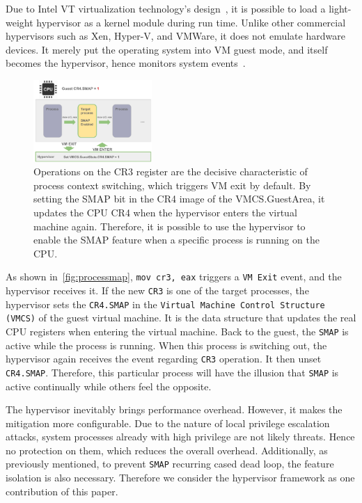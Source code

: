 Due to Intel VT virtualization technology's design~\cite{neiger2006intel}, it is possible to load a light-weight hypervisor as a kernel module during run time. Unlike other commercial hypervisors such as Xen, Hyper-V, and VMWare, it does not emulate hardware devices. It merely put the operating system into VM guest mode, and itself becomes the hypervisor, hence monitors system events~\cite{howtohide}.


\begin{figure}[th]
  \includegraphics[width=0.40\textwidth]{figures/processmap3}
  \centering
  \caption{Operations on the CR3 register are the decisive characteristic of process context switching, which triggers VM exit by default. By setting the SMAP bit in the CR4 image of the VMCS.GuestArea, it updates the CPU CR4 when the hypervisor enters the virtual machine again. Therefore, it is possible to use the hypervisor to enable the SMAP feature when a specific process is running on the CPU.}
  \label{fig:processmap}
\end{figure}


As shown in~\autoref{fig:processmap}, \texttt{mov cr3, eax} triggers a \texttt{VM Exit} event, and the hypervisor receives it. If the new \texttt{CR3} is one of the target processes, the hypervisor sets the \texttt{CR4.SMAP} in the \texttt{Virtual Machine Control Structure (VMCS)} of the guest virtual machine. It is the data structure that updates the real CPU registers when entering the virtual machine. Back to the guest, the \texttt{SMAP} is active while the process is running. When this process is switching out, the hypervisor again receives the event regarding \texttt{CR3} operation. It then unset \texttt{CR4.SMAP}. Therefore, this particular process will have the illusion that \texttt{SMAP} is active continually while others feel the opposite.

The hypervisor inevitably brings performance overhead. However, it makes the mitigation more configurable. Due to the nature of local privilege escalation attacks, system processes already with high privilege are not likely threats. Hence no protection on them, which reduces the overall overhead.  Additionally, as previously mentioned, to prevent \texttt{SMAP} recurring cased dead loop, the feature isolation is also necessary. Therefore we consider the hypervisor framework as one contribution of this paper.
